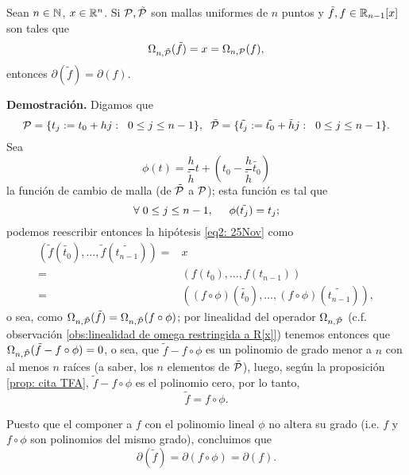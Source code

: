 \begin{prop}
\label{prop: igualdad de grado (menor a n) si dos polinomios al discretizarse dan x}
Sean $n \in \mathbb{N}$, $x \in \mathbb{R}^{n}$.
Si $\mathcal{P}, \tilde{\mathcal{P}}$ son mallas uniformes
de $n$ puntos y $\tilde{f}, f \in \mathbb{R}_{n-1}[x]$
son tales que
\begin{equation}
\label{eq2: 25Nov}
\Omega_{n, \tilde{\mathcal{P}}}(\tilde{f})= x = 
\Omega_{n, \mathcal{P}}(f),
\end{equation}
entonces $\partial(\tilde{f})=\partial(f)$.
\end{prop}
\noindent
\textbf{Demostración.}
Digamos que 
\[
\mathcal{P}=\{t_{j}:=t_{0}+hj: \hspace{0.2cm} 0 \leq j \leq n-1 \},
\hspace{0.2cm}
\mathcal{\tilde{P}}=\{
\tilde{t_{j}}:=\tilde{t_{0}}+ \tilde{h}j: \hspace{0.2cm} 0 \leq j \leq n-1 \}.
\]
Sea 
\[
\phi(t)= \frac{h}{\tilde{h}}t+ \left( t_{0}-  \frac{h}{\tilde{h}}
\tilde{t_{0}}  \right)
\]
la función de cambio de malla
(de $\tilde{\mathcal{P}}$ a $\mathcal{P}$); esta función es 
tal que
\[
\forall \hspace{0.1cm} 0 \leq j \leq n-1, 
\hspace{0.5cm} \phi(\tilde{t_{j}})= 
t_{j};
\]
podemos reescribir entonces la hipótesis \eqref{eq2: 25Nov}
como 
\begin{align*}
(\tilde{f}(\tilde{t_{0}}), \ldots , \tilde{f}(\tilde{t_{n-1}}))
= & x \\
=& (f(t_{0}), \ldots , f(t_{n-1})) \\
=& ((f \circ \phi) (\tilde{t_{0}}), \ldots , 
(f \circ \phi) (\tilde{t_{n-1}})),
\end{align*}
o sea, como $\Omega_{n, \tilde{\mathcal{P}}}(\tilde{f})=
\Omega_{n, \tilde{\mathcal{P}}}(f \circ \phi)$; por linealidad
del operador $\Omega_{n, \tilde{\mathcal{P}}}$
(c.f. observación 
\ref{obs:linealidad de omega restringida a R[x]})
tenemos entonces que
$\Omega_{n, \tilde{\mathcal{P}}}(\tilde{f}-f \circ \phi)=0$,
o sea, que 
$\tilde{f}-f \circ \phi$ es un polinomio de
grado menor a $n$ con al menos $n$ raíces 
(a saber, los $n$ elementos de $\tilde{\mathcal{P}}$), luego, 
según la proposición \ref{prop: cita TFA},
$\tilde{f}-f \circ \phi$
es el polinomio cero, por lo tanto, 
\begin{equation*}
\label{eq3: 25Nov}
\tilde{f}=f \circ \phi.
\end{equation*}

Puesto que el componer a $f$ con el polinomio lineal
$\phi$ no altera su grado (i.e. $f$ y $f \circ \phi$
son polinomios del mismo grado), concluimos que
\[
\partial(\tilde{f})= \partial(f \circ \phi)=
\partial(f).
\]
\QEDB
\vspace{0.2cm}

